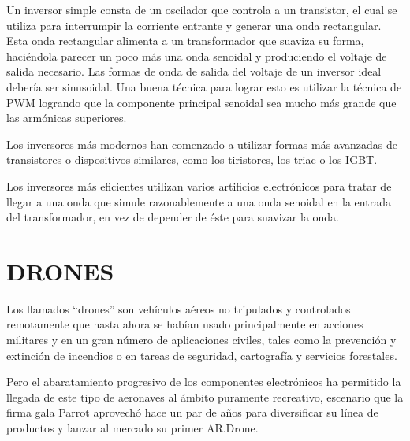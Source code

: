 \documentclass[12pt]{article}
\begin{document}
\vspace{15PT}
Un inversor simple consta de un oscilador que controla a un transistor, el cual se utiliza para interrumpir la corriente entrante y generar una onda rectangular.
Esta onda rectangular alimenta a un transformador que suaviza su forma, haciéndola parecer un poco más una onda senoidal y produciendo el voltaje de salida necesario. Las formas de onda de salida del voltaje de un inversor ideal debería ser sinusoidal. Una buena técnica para lograr esto es utilizar la técnica de PWM logrando que la componente principal senoidal sea mucho más grande que las armónicas superiores.

\vspace{15PT}
Los inversores más modernos han comenzado a utilizar formas más avanzadas de transistores o dispositivos similares, como los tiristores, los triac o los IGBT.

\vspace{15PT}
Los inversores más eficientes utilizan varios artificios electrónicos para tratar de llegar a una onda que simule razonablemente a una onda senoidal en la entrada del transformador, en vez de depender de éste para suavizar la onda.

\vspace{30pt}
\section{DRONES}

Los llamados “drones” son vehículos aéreos no tripulados y controlados remotamente que hasta ahora se habían usado principalmente en acciones militares y en un gran número de aplicaciones civiles, tales como la prevención y extinción de incendios o en tareas de seguridad, cartografía y servicios forestales.

Pero el abaratamiento progresivo de los componentes electrónicos ha permitido la llegada de este tipo de aeronaves al ámbito puramente recreativo, escenario que la firma gala Parrot aprovechó hace un par de años para diversificar su línea de productos y lanzar al mercado su primer AR.Drone.

\newpage

 


\end{document}
